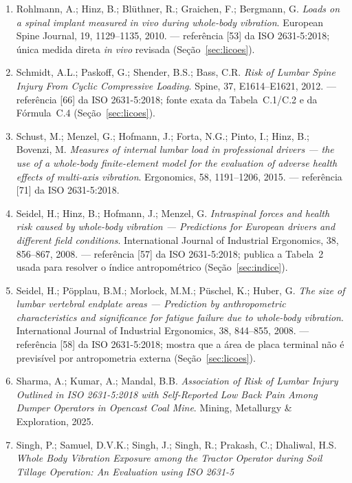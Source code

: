 \documentclass[11pt,a4paper]{article}
\begin{document}
\begin{enumerate}
\item Rohlmann, A.; Hinz, B.; Blüthner, R.; Graichen, F.; Bergmann, G.
      \emph{Loads on a spinal implant measured in vivo during whole-body
      vibration}. European Spine Journal, 19, 1129--1135, 2010. ---
      referência [53] da ISO 2631-5:2018; única medida direta \emph{in vivo}
      revisada (Seção~\ref{sec:licoes}).
\item Schmidt, A.L.; Paskoff, G.; Shender, B.S.; Bass, C.R. \emph{Risk of
      Lumbar Spine Injury From Cyclic Compressive Loading}. Spine, 37,
      E1614--E1621, 2012. --- referência [66] da ISO 2631-5:2018; fonte
      exata da Tabela~C.1/C.2 e da Fórmula~C.4 (Seção~\ref{sec:licoes}).
\item Schust, M.; Menzel, G.; Hofmann, J.; Forta, N.G.; Pinto, I.; Hinz, B.;
      Bovenzi, M. \emph{Measures of internal lumbar load in professional
      drivers --- the use of a whole-body finite-element model for the
      evaluation of adverse health effects of multi-axis vibration}.
      Ergonomics, 58, 1191--1206, 2015. --- referência [71] da ISO
      2631-5:2018.
\item Seidel, H.; Hinz, B.; Hofmann, J.; Menzel, G. \emph{Intraspinal forces
      and health risk caused by whole-body vibration --- Predictions for
      European drivers and different field conditions}. International
      Journal of Industrial Ergonomics, 38, 856--867, 2008. --- referência
      [57] da ISO 2631-5:2018; publica a Tabela~2 usada para resolver o
      índice antropométrico (Seção~\ref{sec:indice}).
\item Seidel, H.; Pöpplau, B.M.; Morlock, M.M.; Püschel, K.; Huber, G.
      \emph{The size of lumbar vertebral endplate areas --- Prediction by
      anthropometric characteristics and significance for fatigue failure
      due to whole-body vibration}. International Journal of Industrial
      Ergonomics, 38, 844--855, 2008. --- referência [58] da ISO
      2631-5:2018; mostra que a área de placa terminal não é previsível por
      antropometria externa (Seção~\ref{sec:licoes}).
\item Sharma, A.; Kumar, A.; Mandal, B.B. \emph{Association of Risk of
      Lumbar Injury Outlined in ISO 2631-5:2018 with Self-Reported Low Back
      Pain Among Dumper Operators in Opencast Coal Mine}. Mining, Metallurgy
      \& Exploration, 2025.
\item Singh, P.; Samuel, D.V.K.; Singh, J.; Singh, R.; Prakash, C.; Dhaliwal,
      H.S. \emph{Whole Body Vibration Exposure among the Tractor Operator
      during Soil Tillage Operation: An Evaluation using ISO 2631-5
}
\end{enumerate}
\end{document}
